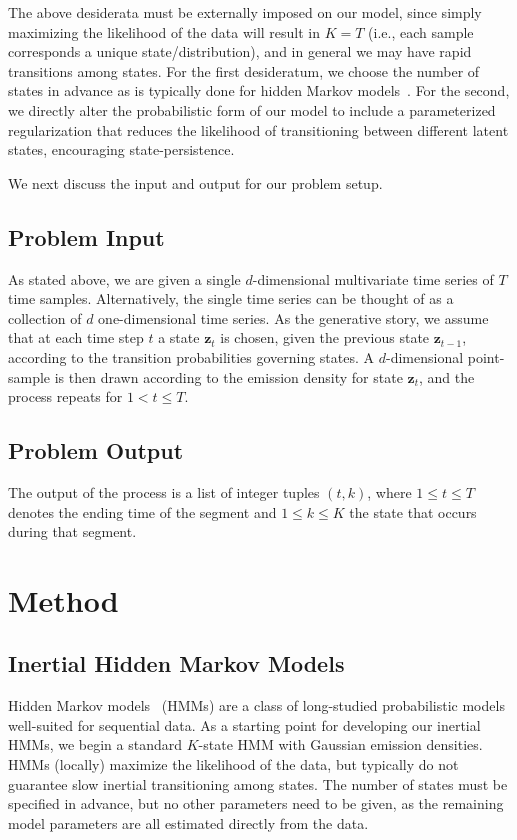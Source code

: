 \documentclass[12pt]{article}
\begin{document}
The above desiderata must be externally imposed on our model, since simply maximizing the likelihood of the data will result in $K = T$ (i.e., each sample corresponds a unique state/distribution), and in general we may have rapid transitions among states. For the first desideratum,  we choose the number of states in advance as is typically done for hidden Markov models~\cite{rabiner1989tutorial}. For the second, we directly alter the probabilistic form of our model to include a parameterized regularization that reduces the likelihood of transitioning between different latent states, encouraging state-persistence.

We next discuss the input and output for our problem setup.

\subsection{Problem Input}

As stated above, we are given a single $d$-dimensional multivariate time series of $T$ time samples. Alternatively, the single time series can be thought of as a collection of $d$ one-dimensional time series. As the generative story, we assume that at each time step $t$ a state $\mathbf{z}_t$ is chosen, given the previous state $\mathbf{z}_{t-1}$, according to the transition probabilities governing states. A $d$-dimensional point-sample is then drawn according to the emission density for state $\mathbf{z}_t$, and the process repeats for $1 < t \leq T$.

\subsection{Problem Output}

The output of the process is a list of integer tuples $(t, k)$, where $1 \leq t \leq T$ denotes the ending time of the segment and $1 \leq k \leq K$ the state that occurs during that segment. 

\section{Method}

\subsection{Inertial Hidden Markov Models}

Hidden Markov models~\cite{rabiner1989tutorial} (HMMs) are a class of long-studied probabilistic models well-suited for sequential data. As a starting point for developing our inertial HMMs, we begin a standard $K$-state HMM with Gaussian emission densities. HMMs (locally) maximize the likelihood of the data, but typically do not guarantee slow inertial transitioning among states. The number of states must be specified in advance, but no other parameters need to be given, as the remaining model parameters are all estimated directly from the data. 
\end{document}
